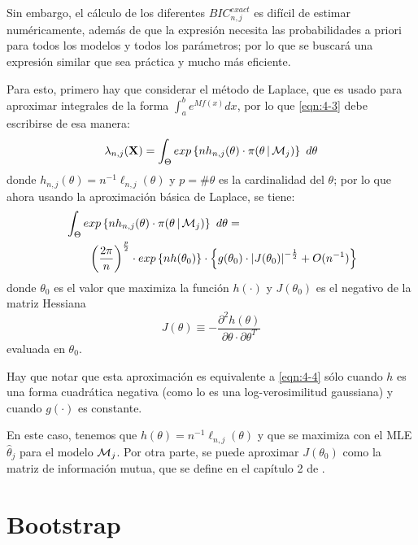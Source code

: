 Sin embargo, el cálculo de los diferentes $BIC_{n, j}^{exact}$ es difícil de estimar numéricamente, además de que la expresión necesita las probabilidades a priori para todos los modelos y todos los parámetros; por lo que se buscará una expresión similar que sea práctica y mucho más eficiente.

Para esto, primero hay que considerar el método de Laplace, que es usado para aproximar integrales de la forma $\int_a^b e^{M f(x)} dx$, por lo que \eqref{eqn:4-3} debe escribirse de esa manera: 
\begin{equation}
\lambda_{n, j}(\textbf{X}) = \int_{\Theta} exp\left\lbrace n h_{n, j}(\theta) \cdot \pi(\theta \,|\, \mathcal{M}_j) \right\rbrace ~d\theta 
\label{eqn:4-6}
\end{equation}
donde $h_{n, j}(\theta) = n^{-1} \ell_{n, j}(\theta)$ y $p = \#\theta$ es la cardinalidad del $\theta$; por lo que ahora usando la aproximación básica de Laplace, se tiene: 
\begin{equation}
\begin{split}
 &\int_{\Theta} exp \left\lbrace n h_{n, j}(\theta) \cdot \pi(\theta \,|\, \mathcal{M}_j) \right\rbrace ~d\theta = \\
 & \quad\quad \left( \frac{2 \pi}{n} \right)^{\frac{p}{2}} \cdot exp \left\lbrace n h(\theta_0) \right\rbrace \cdot
 \left\lbrace g(\theta_0) \cdot \left| J(\theta_0) \right| ^{-\frac{1}{2}} + O(n^{-1}) \right\rbrace
\end{split}
\label{eqn:4-7}
\end{equation}
donde $\theta_0$ es el valor que maximiza la función $h(\cdot)$ y $J(\theta_0)$ es el negativo de la matriz Hessiana 
\begin{equation}
J(\theta) \equiv -\frac{\partial^2 h(\theta)}{\partial \theta \cdot \partial \theta^T}
\label{eqn:4-8}
\end{equation}
evaluada en $\theta_0$.

Hay que notar que esta aproximación es equivalente a \eqref{eqn:4-4} sólo cuando $h$ es una forma cuadrática negativa (como lo es una log-verosimilitud gaussiana) y cuando $g(\cdot)$ es constante. 

En este caso, tenemos que $h(\theta) = n^{-1} \ell_{n, j}(\theta)$ y que se maximiza con el \ac{MLE} $\hat \theta_j$ para el modelo $\mathcal{M}_j$. Por otra parte, se puede aproximar $J(\theta_0)$ como la matriz de información mutua, que se define en el capítulo 2 de \cite{Claeskens2010}.

\section{Bootstrap}

